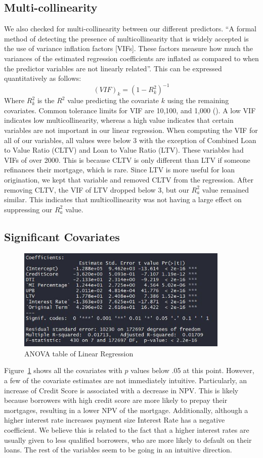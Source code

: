 \documentclass[12 pt]{uncw_thesis}
\theoremstyle{plain}
\theoremstyle{remark}
\theoremstyle{definition}
\begin{document}
\subsection{Multi-collinearity}
We also checked for multi-collinearity between our different predictors. ``A formal method of detecting the presence of multicollinearity that is widely accepted is the use of variance inflation factors [VIFs]. These factors measure how much the variances of the estimated regression coefficients are inflated as compared to when the predictor variables are not linearly related''\cite{512}. This can be expressed quantitatively as follows: 
\[(VIF)_k = (1-R_k^2)^{-1}\]
Where $R_k^2$ is the $R^2$ value predicting the covariate $k$ using the remaining covariates. Common tolerance limits for VIF are 10,100, and 1,000 (\cite[p.~408-410]{512}). A low VIF indicates low multicollinearity, whereas a high value indicates that certain variables are not important in our linear regression. 
When computing the VIF for all of our variables, all values were below 3 with the exception of Combined Loan to Value Ratio (CLTV) and Loan to Value Ratio (LTV). These variables had VIFs of over 2000. This is because CLTV is only different than LTV if someone refinances their mortgage, which is rare. Since LTV is more useful for loan origination, we kept that variable and removed CLTV from the regression. After removing CLTV, the VIF of LTV dropped below 3, but our \(R^2_a\) value remained similar. This indicates that multicollinearity was not having a large effect on suppressing our \(R^2_a\) value.
\subsection{Significant Covariates}
\begin{figure}
	\includegraphics[width=0.9\textwidth]{images/ANOVA.jpg}
	\caption{ANOVA table of Linear Regression}
	\label{fig:ANOVA}
\end{figure}
Figure~\ref{fig:ANOVA} shows all the covariates with $p$ values below .05 at this point. However, a few of the covariate estimates are not immediately intuitive. Particularly, an increase of Credit Score is associated with a decrease in NPV. This is likely because borrowers with high credit score are more likely to prepay their mortgages, resulting in a lower NPV of the mortgage. Additionally, although a higher interest rate increases payment size Interest Rate has a negative coefficient. We believe this is related to the fact that a higher interest rates are usually given to less qualified borrowers, who are more likely to default on their loans. The rest of the variables seem to be going in an intuitive direction. 
\end{document}
